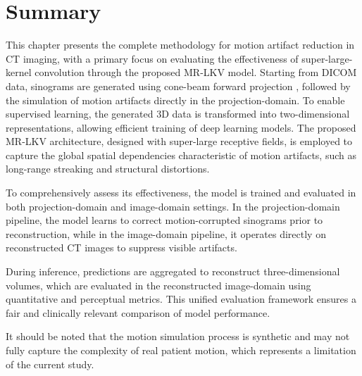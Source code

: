 \section{Summary}
This chapter presents the complete methodology for motion artifact reduction in CT imaging, with a primary focus on evaluating the effectiveness of super-large-kernel convolution through the proposed MR-LKV model. Starting from DICOM data, sinograms are generated using cone-beam forward projection \cite{diffct2025}, followed by the simulation of motion artifacts directly in the projection-domain. To enable supervised learning, the generated 3D data is transformed into two-dimensional representations, allowing efficient training of deep learning models. The proposed MR-LKV architecture, designed with super-large receptive fields, is employed to capture the global spatial dependencies characteristic of motion artifacts, such as long-range streaking and structural distortions.

To comprehensively assess its effectiveness, the model is trained and evaluated in both projection-domain and image-domain settings. In the projection-domain pipeline, the model learns to correct motion-corrupted sinograms prior to reconstruction, while in the image-domain pipeline, it operates directly on reconstructed CT images to suppress visible artifacts.

During inference, predictions are aggregated to reconstruct three-dimensional volumes, which are evaluated in the reconstructed image-domain using quantitative and perceptual metrics. This unified evaluation framework ensures a fair and clinically relevant comparison of model performance.

It should be noted that the motion simulation process is synthetic and may not fully capture the complexity of real patient motion, which represents a limitation of the current study.

 

